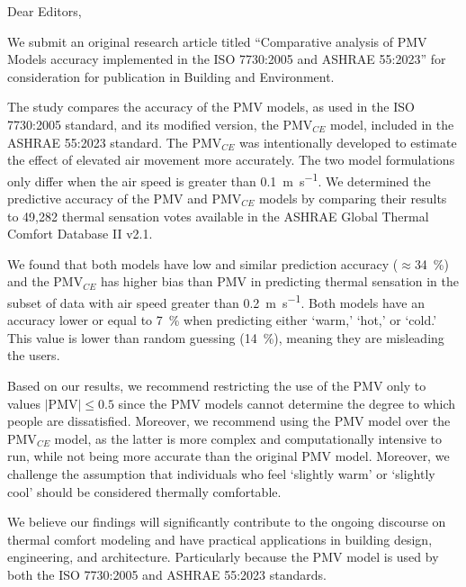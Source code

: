 \documentclass[11pt,a4paper,roman]{moderncv}        %
\begin{document}
\date{\today}
\opening{Dear Editors,}

\makelettertitle

We submit an original research article titled ``Comparative analysis of PMV Models accuracy implemented in the ISO 7730:2005 and ASHRAE 55:2023'' for consideration for publication in Building and Environment.

The study compares the accuracy of the PMV models, as used in the ISO 7730:2005 standard, and its modified version, the PMV$_{CE}$ model, included in the ASHRAE 55:2023 standard.
The PMV$_{CE}$ was intentionally developed to estimate the effect of elevated air movement more accurately.
The two model formulations only differ when the air speed is greater than \qty{0.1}{\m\per\s}.
We determined the predictive accuracy of the PMV and PMV$_{CE}$ models by comparing their results to 49,282 thermal sensation votes available in the ASHRAE Global Thermal Comfort Database II v2.1.

We found that both models have low and similar prediction accuracy ($ \approx$\qty{34}{\percent}) and the PMV$_{CE}$ has higher bias than PMV in predicting thermal sensation in the subset of data with air speed greater than \qty{0.2}{\m\per\s}.
Both models have an accuracy lower or equal to \qty{7}{\percent} when predicting either `warm,' `hot,' or `cold.'
This value is lower than random guessing (\qty{14}{\percent}), meaning they are misleading the users.

Based on our results, we recommend restricting the use of the PMV only to values $\lvert \textrm{PMV} \lvert \leq 0.5$ since the PMV models cannot determine the degree to which people are dissatisfied.
Moreover, we recommend using the PMV model over the PMV$_{CE}$ model, as the latter is more complex and computationally intensive to run, while not being more accurate than the original PMV model.
Moreover, we challenge the assumption that individuals who feel `slightly warm' or `slightly cool' should be considered thermally comfortable.

We believe our findings will significantly contribute to the ongoing discourse on thermal comfort modeling and have practical applications in building design, engineering, and architecture.
Particularly because the PMV model is used by both the ISO 7730:2005 and ASHRAE 55:2023 standards.
\end{document}
